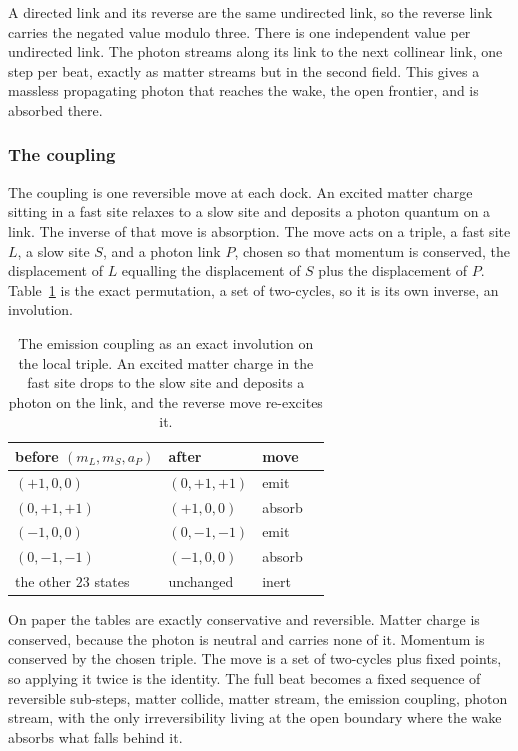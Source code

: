 A directed link and its reverse are the same undirected link, so the reverse link carries the negated value modulo three. There is one independent value per undirected link. The photon streams along its link to the next collinear link, one step per beat, exactly as matter streams but in the second field. This gives a massless propagating photon that reaches the wake, the open frontier, and is absorbed there.

\subsubsection{The coupling}

The coupling is one reversible move at each dock. An excited matter charge sitting in a fast site relaxes to a slow site and deposits a photon quantum on a link. The inverse of that move is absorption. The move acts on a triple, a fast site $L$, a slow site $S$, and a photon link $P$, chosen so that momentum is conserved, the displacement of $L$ equalling the displacement of $S$ plus the displacement of $P$. Table~\ref{tab:emission} is the exact permutation, a set of two-cycles, so it is its own inverse, an involution.

\begin{table}[ht]
\centering
\begin{tabular}{@{}llll@{}}
\toprule
before $(m_L, m_S, a_P)$ & after & move \\
\midrule
$(+1, 0, 0)$ & $(0, +1, +1)$ & emit \\
$(0, +1, +1)$ & $(+1, 0, 0)$ & absorb \\
$(-1, 0, 0)$ & $(0, -1, -1)$ & emit \\
$(0, -1, -1)$ & $(-1, 0, 0)$ & absorb \\
the other $23$ states & unchanged & inert \\
\bottomrule
\end{tabular}
\caption{The emission coupling as an exact involution on the local triple. An excited matter charge in the fast site drops to the slow site and deposits a photon on the link, and the reverse move re-excites it.}
\label{tab:emission}
\end{table}

On paper the tables are exactly conservative and reversible. Matter charge is conserved, because the photon is neutral and carries none of it. Momentum is conserved by the chosen triple. The move is a set of two-cycles plus fixed points, so applying it twice is the identity. The full beat becomes a fixed sequence of reversible sub-steps, matter collide, matter stream, the emission coupling, photon stream, with the only irreversibility living at the open boundary where the wake absorbs what falls behind it.

